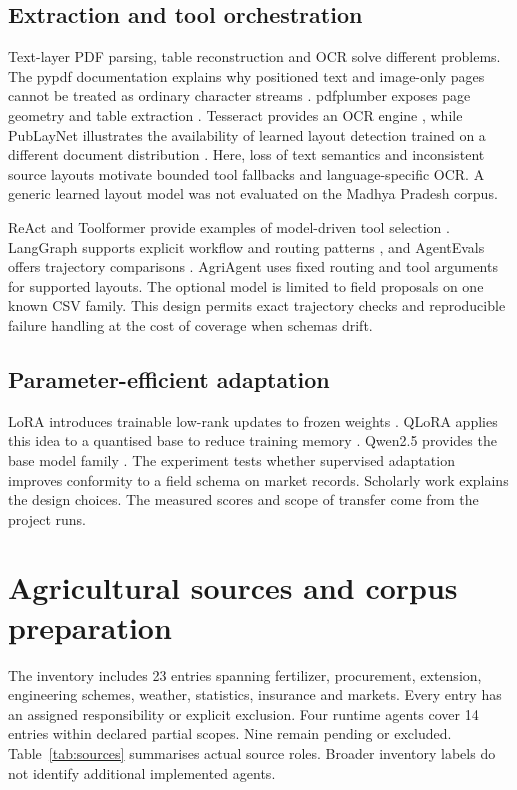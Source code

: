 \documentclass[11pt,a4paper]{article}
\begin{document}
\subsection{Extraction and tool orchestration}
Text-layer PDF parsing, table reconstruction and OCR solve different problems. The pypdf documentation explains why positioned text and image-only pages cannot be treated as ordinary character streams \cite{pypdf}. pdfplumber exposes page geometry and table extraction \cite{pdfplumber}. Tesseract provides an OCR engine \cite{tess}, while PubLayNet illustrates the availability of learned layout detection trained on a different document distribution \cite{publay}. Here, loss of text semantics and inconsistent source layouts motivate bounded tool fallbacks and language-specific OCR. A generic learned layout model was not evaluated on the Madhya Pradesh corpus.

ReAct and Toolformer provide examples of model-driven tool selection \cite{react,toolformer}. LangGraph supports explicit workflow and routing patterns \cite{langgraph}, and AgentEvals offers trajectory comparisons \cite{agentevals}. AgriAgent uses fixed routing and tool arguments for supported layouts. The optional model is limited to field proposals on one known CSV family. This design permits exact trajectory checks and reproducible failure handling at the cost of coverage when schemas drift.

\subsection{Parameter-efficient adaptation}
LoRA introduces trainable low-rank updates to frozen weights \cite{lora}. QLoRA applies this idea to a quantised base to reduce training memory \cite{qlora}. Qwen2.5 provides the base model family \cite{qwen}. The experiment tests whether supervised adaptation improves conformity to a field schema on market records. Scholarly work explains the design choices. The measured scores and scope of transfer come from the project runs.

\clearpage
\section{Agricultural sources and corpus preparation}
The inventory includes 23 entries spanning fertilizer, procurement, extension, engineering schemes, weather, statistics, insurance and markets. Every entry has an assigned responsibility or explicit exclusion. Four runtime agents cover 14 entries within declared partial scopes. Nine remain pending or excluded. Table~\ref{tab:sources} summarises actual source roles. Broader inventory labels do not identify additional implemented agents.
\end{document}
